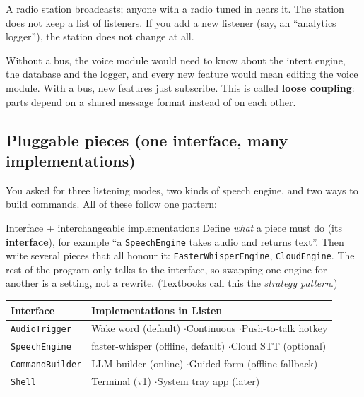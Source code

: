 \documentclass[11pt,a4paper]{article}
\begin{document}
\begin{analogy}
A radio station broadcasts; anyone with a radio tuned in hears it. The station does not
keep a list of listeners. If you add a new listener (say, an ``analytics logger''), the
station does not change at all.
\end{analogy}

\begin{why}
Without a bus, the voice module would need to know about the intent engine, the database
and the logger, and every new feature would mean editing the voice module. With a bus, new
features just subscribe. This is called \textbf{loose coupling}: parts depend on a shared
message format instead of on each other.
\end{why}

\subsection{Pluggable pieces (one interface, many implementations)}

You asked for three listening modes, two kinds of speech engine, and two ways to build
commands. All of these follow one pattern:

\begin{concept}{Interface + interchangeable implementations}
Define \emph{what} a piece must do (its \textbf{interface}), for example ``a
\texttt{SpeechEngine} takes audio and returns text''. Then write several pieces that all
honour it: \texttt{FasterWhisperEngine}, \texttt{CloudEngine}. The rest of the program only
talks to the interface, so swapping one engine for another is a setting, not a rewrite.
(Textbooks call this the \emph{strategy pattern}.)
\end{concept}

\begin{center}
\renewcommand{\arraystretch}{1.2}
\begin{tabularx}{\textwidth}{l X}
\toprule
\textbf{Interface} & \textbf{Implementations in Listen} \\
\midrule
\texttt{AudioTrigger}   & Wake word (default) \quad$\cdot$\quad Continuous \quad$\cdot$\quad Push-to-talk hotkey \\
\texttt{SpeechEngine}   & faster-whisper (offline, default) \quad$\cdot$\quad Cloud STT (optional) \\
\texttt{CommandBuilder} & LLM builder (online) \quad$\cdot$\quad Guided form (offline fallback) \\
\texttt{Shell}          & Terminal (v1) \quad$\cdot$\quad System tray app (later) \\
\bottomrule
\end{tabularx}
\end{center}
\end{document}
